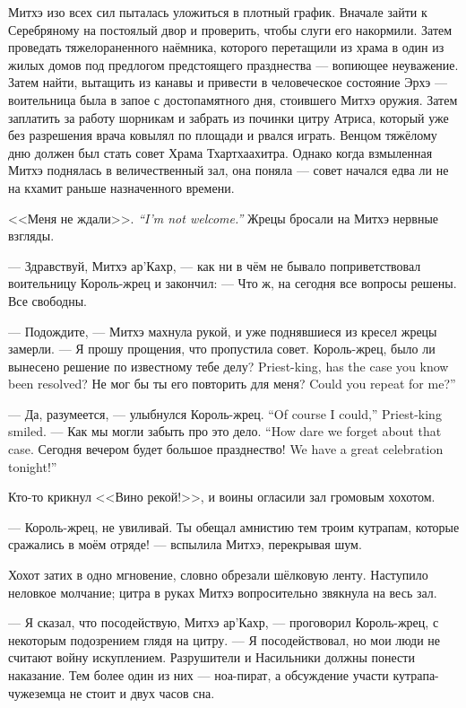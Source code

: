 Митхэ изо всех сил пыталась уложиться в плотный график.
Вначале зайти к Серебряному на постоялый двор и проверить, чтобы слуги его накормили.
Затем проведать тяжелораненного наёмника, которого перетащили из храма в один из жилых домов под предлогом предстоящего празднества --- вопиющее неуважение.
Затем найти, вытащить из канавы и привести в человеческое состояние Эрхэ --- воительница была в запое с достопамятного дня, стоившего Митхэ оружия.
Затем заплатить за работу шорникам и забрать из починки цитру Атриса, который уже без разрешения врача ковылял по площади и рвался играть.
Венцом тяжёлому дню должен был стать совет Храма Тхартхаахитра.
Однако когда взмыленная Митхэ поднялась в величественный зал, она поняла --- совет начался едва ли не на кхамит раньше назначенного времени.

{<<Меня не ждали>>.}
{\emph{``I'm not welcome.''}}
Жрецы бросали на Митхэ нервные взгляды.

--- Здравствуй, Митхэ ар'Кахр, --- как ни в чём не бывало поприветствовал воительницу Король-жрец и закончил:
--- Что ж, на сегодня все вопросы решены.
Все свободны.

--- Подождите, --- Митхэ махнула рукой, и уже поднявшиеся из кресел жрецы замерли.
--- Я прошу прощения, что пропустила совет.
{Король-жрец, было ли вынесено решение по известному тебе делу?}
{Priest-king, has the case you know been resolved?}
{Не мог бы ты его повторить для меня?}
{Could you repeat for me?''}

{--- Да, разумеется, --- улыбнулся Король-жрец.}
{``Of course I could,'' Priest-king smiled.}
{--- Как мы могли забыть про это дело.}
{``How dare we forget about that case.}
{Сегодня вечером будет большое празднество!}
{We have a great celebration tonight!''}

Кто-то крикнул <<Вино рекой!>>, и воины огласили зал громовым хохотом.

--- Король-жрец, не увиливай.
Ты обещал амнистию тем троим кутрапам, которые сражались в моём отряде! --- вспылила Митхэ, перекрывая шум.

Хохот затих в одно мгновение, словно обрезали шёлковую ленту.
Наступило неловкое молчание;
цитра в руках Митхэ вопросительно звякнула на весь зал.

--- Я сказал, что посодействую, Митхэ ар'Кахр, --- проговорил Король-жрец, с некоторым подозрением глядя на цитру.
--- Я посодействовал, но мои люди не считают войну искуплением.
Разрушители и Насильники должны понести наказание.
Тем более один из них --- ноа-пират, а обсуждение участи кутрапа-чужеземца не стоит и двух часов сна.

